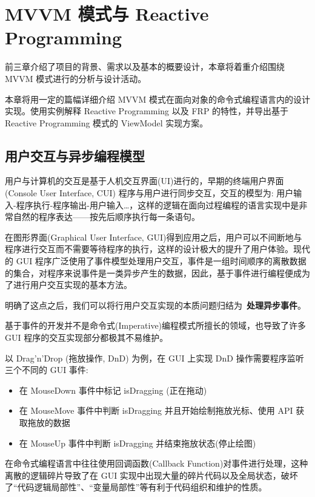 \chapter{MVVM 模式与 Reactive Programming}

前三章介绍了项目的背景、需求以及基本的概要设计，本章将着重介绍围绕 MVVM 模式进行的分析与设计活动。

本章将用一定的篇幅详细介绍 MVVM 模式在面向对象的命令式编程语言内的设计实现。使用实例解释 Reactive Programming 以及 FRP 的特性，并导出基于 Reactive Programming 模式的 ViewModel 实现方案。

\section{用户交互与异步编程模型}

用户与计算机的交互是基于人机交互界面(UI)进行的，早期的终端用户界面 (Console User Interface, CUI) 程序与用户进行同步交互，交互的模型为: 用户输入-程序执行-程序输出-用户输入\ldots，这样的逻辑在面向过程编程的语言实现中是非常自然的程序表达——按先后顺序执行每一条语句。

在图形界面(Graphical User Interface, GUI)得到应用之后，用户可以不间断地与程序进行交互而不需要等待程序的执行，这样的设计极大的提升了用户体验。现代的 GUI 程序广泛使用了事件模型处理用户交互，事件是一组时间顺序的离散数据的集合，对程序来说事件是一类异步产生的数据，因此，基于事件进行编程便成为了进行用户交互实现的基本方法。

明确了这点之后，我们可以将行用户交互实现的本质问题归结为~\textbf{处理异步事件}。

基于事件的开发并不是命令式(Imperative)编程模式所擅长的领域，也导致了许多 GUI 程序的交互实现部分都极其不易维护。

以 Drag'n'Drop (拖放操作, DnD) 为例\cite{Zhao2010}，在 GUI 上实现 DnD 操作需要程序监听三个不同的 GUI 事件:

\begin{itemize}
  \item 在 MouseDown 事件中标记 isDragging (正在拖动)
  \item 在 MouseMove 事件中判断 isDragging 并且开始绘制拖放光标、使用 API 获取拖放的数据
  \item 在 MouseUp 事件中判断 isDragging 并结束拖放状态(停止绘图)
\end{itemize}

在命令式编程语言中往往使用回调函数(Callback Function)对事件进行处理，这种离散的逻辑碎片导致了在 GUI 实现中出现大量的碎片代码以及全局状态，破坏了“代码逻辑局部性”、“变量局部性”等有利于代码组织和维护的性质。

